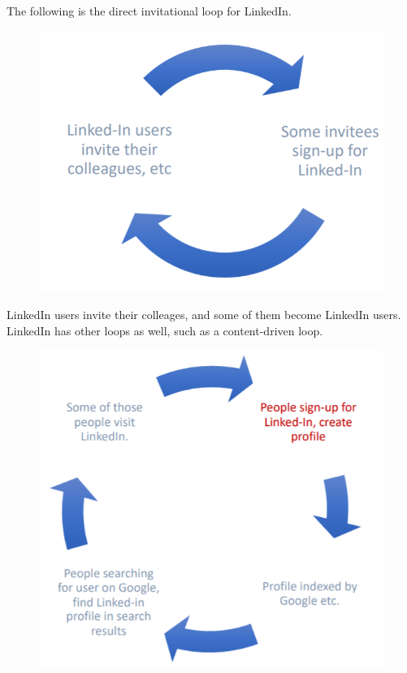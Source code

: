 \documentclass[a4paper, openany]{memoir}
\begin{document}
The following is the direct invitational loop for LinkedIn.
\begin{figure}[H]
    \centering
    \includegraphics[scale=0.5]{src/18.3 Linkedin growth loop.PNG}
\end{figure}
\noindent LinkedIn users invite their colleages, and some of them become LinkedIn users. LinkedIn has other loops as well, such as a content-driven loop.
\begin{figure}[H]
    \centering
    \includegraphics[scale=0.5]{src/18.4 LinkedIn growth loop 2.PNG}
\end{figure}
\end{document}
